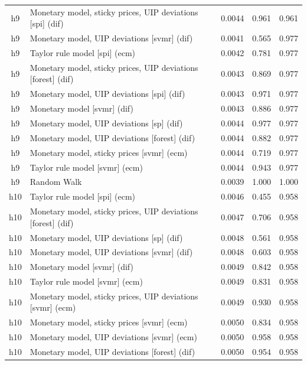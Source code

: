 \begin{ThreePartTable}
\begin{longtable}[t]{cp{5.5cm}ccc}
\addlinespace
h9 & \raggedright Monetary model, sticky prices, UIP deviations [spi] (dif) & 0.0044 & 0.961 & 0.961\\
h9 & \raggedright Monetary model, UIP deviations [svmr] (dif) & 0.0041 & 0.565 & 0.977\\
h9 & \raggedright Taylor rule model [spi] (ecm) & 0.0042 & 0.781 & 0.977\\
h9 & \raggedright Monetary model, sticky prices, UIP deviations [forest] (dif) & 0.0043 & 0.869 & 0.977\\
h9 & \raggedright Monetary model, UIP deviations [spi] (dif) & 0.0043 & 0.971 & 0.977\\
h9 & \raggedright Monetary model [svmr] (dif) & 0.0043 & 0.886 & 0.977\\
h9 & \raggedright Monetary model, UIP deviations [sp] (dif) & 0.0044 & 0.977 & 0.977\\
h9 & \raggedright Monetary model, UIP deviations [forest] (dif) & 0.0044 & 0.882 & 0.977\\
h9 & \raggedright Monetary model, sticky prices [svmr] (ecm) & 0.0044 & 0.719 & 0.977\\
h9 & \raggedright Taylor rule model [svmr] (ecm) & 0.0044 & 0.943 & 0.977\\
h9 & \raggedright Random Walk & 0.0039 & 1.000 & 1.000\\
\addlinespace
h10 & \raggedright Taylor rule model [spi] (ecm) & 0.0046 & 0.455 & 0.958\\
h10 & \raggedright Monetary model, sticky prices, UIP deviations [forest] (dif) & 0.0047 & 0.706 & 0.958\\
h10 & \raggedright Monetary model, UIP deviations [sp] (dif) & 0.0048 & 0.561 & 0.958\\
h10 & \raggedright Monetary model, UIP deviations [svmr] (dif) & 0.0048 & 0.603 & 0.958\\
h10 & \raggedright Monetary model [svmr] (dif) & 0.0049 & 0.842 & 0.958\\
h10 & \raggedright Taylor rule model [svmr] (ecm) & 0.0049 & 0.831 & 0.958\\
h10 & \raggedright Monetary model, sticky prices, UIP deviations [svmr] (ecm) & 0.0049 & 0.930 & 0.958\\
h10 & \raggedright Monetary model, sticky prices [svmr] (ecm) & 0.0050 & 0.834 & 0.958\\
h10 & \raggedright Monetary model, UIP deviations [svmr] (ecm) & 0.0050 & 0.958 & 0.958\\
h10 & \raggedright Monetary model, UIP deviations [forest] (dif) & 0.0050 & 0.954 & 0.958\\

\end{longtable}
\end{ThreePartTable}
